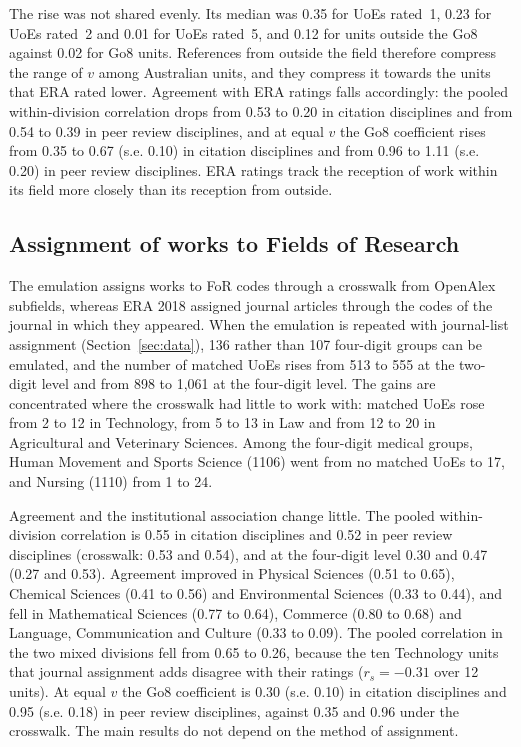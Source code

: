 The rise was not shared evenly. Its median was 0.35 for UoEs rated~1, 0.23 for UoEs rated~2 and 0.01 for UoEs rated~5, and 0.12 for units outside the Go8 against 0.02 for Go8 units. References from outside the field therefore compress the range of $v$ among Australian units, and they compress it towards the units that ERA rated lower. Agreement with ERA ratings falls accordingly: the pooled within-division correlation drops from 0.53 to 0.20 in citation disciplines and from 0.54 to 0.39 in peer review disciplines, and at equal $v$ the Go8 coefficient rises from 0.35 to 0.67 (s.e. 0.10) in citation disciplines and from 0.96 to 1.11 (s.e. 0.20) in peer review disciplines. ERA ratings track the reception of work within its field more closely than its reception from outside.

\subsection{Assignment of works to Fields of Research}
\label{sec:res_journal}

The emulation assigns works to FoR codes through a crosswalk from OpenAlex subfields, whereas ERA 2018 assigned journal articles through the codes of the journal in which they appeared. When the emulation is repeated with journal-list assignment (Section~\ref{sec:data}), 136 rather than 107 four-digit groups can be emulated, and the number of matched UoEs rises from 513 to 555 at the two-digit level and from 898 to 1,061 at the four-digit level. The gains are concentrated where the crosswalk had little to work with: matched UoEs rose from 2 to 12 in Technology, from 5 to 13 in Law and from 12 to 20 in Agricultural and Veterinary Sciences. Among the four-digit medical groups, Human Movement and Sports Science (1106) went from no matched UoEs to 17, and Nursing (1110) from 1 to 24.

Agreement and the institutional association change little. The pooled within-division correlation is 0.55 in citation disciplines and 0.52 in peer review disciplines (crosswalk: 0.53 and 0.54), and at the four-digit level 0.30 and 0.47 (0.27 and 0.53). Agreement improved in Physical Sciences (0.51 to 0.65), Chemical Sciences (0.41 to 0.56) and Environmental Sciences (0.33 to 0.44), and fell in Mathematical Sciences (0.77 to 0.64), Commerce (0.80 to 0.68) and Language, Communication and Culture (0.33 to 0.09). The pooled correlation in the two mixed divisions fell from 0.65 to 0.26, because the ten Technology units that journal assignment adds disagree with their ratings ($r_s = -0.31$ over 12 units). At equal $v$ the Go8 coefficient is 0.30 (s.e. 0.10) in citation disciplines and 0.95 (s.e. 0.18) in peer review disciplines, against 0.35 and 0.96 under the crosswalk. The main results do not depend on the method of assignment.

